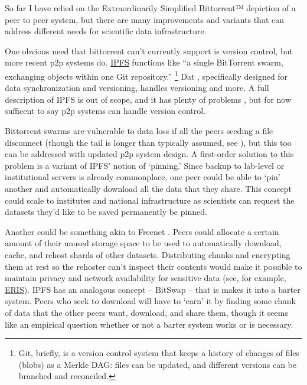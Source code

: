 \documentclass[notoc]{tufte-book}
\begin{document}
So far I have relied on the Extraordinarily Simplified Bittorrent™
depiction of a peer to peer system, but there are many improvements and
variants that can address different needs for scientific data
infrastructure.

One obvious need that bittorrent can't currently support is version
control, but more recent p2p systems do. \href{https://ipfs.io/}{IPFS}
functions like ``a single BitTorrent swarm, exchanging objects within
one Git repository.'' \citep{benetIPFSContentAddressed2014} \footnote{Git, briefly, is a version control system that keeps a
  history of changes of files (blobs) as a Merkle DAG: files can be
  updated, and different versions can be branched and reconciled.} Dat
\citep{ogdenDatDistributedDataset2017} , specifically designed for
data synchronization and versioning, handles versioning and more. A full
description of IPFS is out of scope, and it has plenty of problems \citep{patsakisHydrasIPFSDecentralised2019} , but for now sufficent to
say p2p systems can handle version control.

Bittorrent swarms are vulnerable to data loss if all the peers seeding a
file disconnect (though the tail is longer than typically assumed, see
\citep{zhangUnravelingBitTorrentEcosystem2011} ), but this too can
be addressed with updated p2p system design. A first-order solution to
this problem is a variant of IPFS' notion of `pinning.' Since backup to
lab-level or institutional servers is already commonplace, one peer
could be able to `pin' another and automatically download all the data
that they share. This concept could scale to institutes and national
infrastructure as scientists can request the datasets they'd like to be
saved permanently be pinned.

Another could be something akin to Freenet \citep{clarkeFreenetDistributedAnonymous2001} . Peers could allocate a
certain amount of their unused storage space to be used to automatically
download, cache, and rehost shards of other datasets. Distributing
chunks and encrypting them at rest so the rehoster can't inspect their
contents would make it possible to maintain privacy and network
availability for sensitive data (see, for example,
\href{https://inqlab.net/projects/eris/}{ERIS}). IPFS has an analogous
concept -- BitSwap -- that is makes it into a barter system. Peers who
seek to download will have to `earn' it by finding some chunk of data
that the other peers want, download, and share them, though it seems
like an empirical question whether or not a barter system works or is
necessary.
\end{document}
